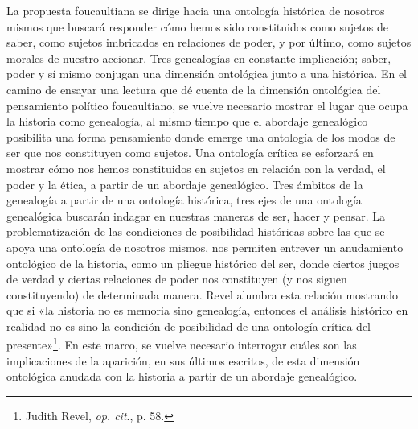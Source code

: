 La propuesta foucaultiana se dirige hacia una ontología histórica de nosotros mismos que buscará responder cómo hemos sido constituidos como sujetos de saber, como sujetos imbricados en relaciones de poder, y por último, como sujetos morales de nuestro accionar. Tres genealogías en constante implicación; saber, poder y sí mismo conjugan una dimensión ontológica junto a una histórica. En el camino de ensayar una lectura que dé cuenta de la dimensión ontológica del pensamiento político foucaultiano, se vuelve necesario mostrar el lugar que ocupa la historia como genealogía, al mismo tiempo que el abordaje genealógico posibilita una forma pensamiento donde emerge una ontología de los modos de ser que nos constituyen como sujetos. Una ontología crítica se esforzará en mostrar cómo nos hemos constituidos en sujetos en relación con la verdad, el poder y la ética, a partir de un abordaje genealógico. Tres ámbitos de la genealogía a partir de una ontología histórica, tres ejes de una ontología genealógica buscarán indagar en nuestras maneras de ser, hacer y pensar. La problematización de las condiciones de posibilidad históricas sobre las que se apoya una ontología de nosotros mismos, nos permiten entrever un anudamiento ontológico de la historia, como un pliegue histórico del ser, donde ciertos juegos de verdad y ciertas relaciones de poder nos constituyen (y nos siguen constituyendo) de determinada manera. Revel alumbra esta relación mostrando que si «la historia no es memoria sino genealogía, entonces el análisis histórico en realidad no es sino la condición de posibilidad de una ontología crítica del presente»\footnote{Judith Revel, \emph{op. cit}., p. 58.}. En este marco, se vuelve necesario interrogar cuáles son las implicaciones de la aparición, en sus últimos escritos, de esta dimensión ontológica anudada con la historia a partir de un abordaje genealógico.

